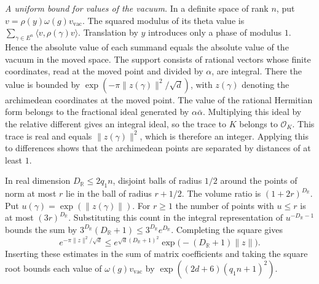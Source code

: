 \emph{A uniform bound for values of the vacuum.}
In a definite space of rank \(n\), put \(v=\rho(y)\omega(g)v_\mathrm{vac}\).
The squared modulus of its theta value is
\(\sum_{\gamma\in E^n}\langle v,\rho(\gamma)v\rangle\).
Translation by \(y\) introduces only a phase of modulus \(1\).
Hence the absolute value of each summand equals the absolute value of
the vacuum in the moved space. The support consists of rational
vectors whose finite coordinates, read at the moved point and divided
by \(\alpha\), are integral. There the value is bounded by
\(\exp(-\pi\|z(\gamma)\|^2/\sqrt d)\), with \(z(\gamma)\) denoting
the archimedean coordinates at the moved point.
The value of the rational Hermitian form belongs to the fractional
ideal generated by \(\alpha\bar\alpha\). Multiplying this ideal by the
relative different gives an integral ideal, so the trace to \(K\)
belongs to \(\mathcal O_K\). This trace is real and equals
\(\|z(\gamma)\|^2\), which is therefore an integer. Applying this
to differences shows that the archimedean points are separated
by distances of at least \(1\).

In real dimension \(D_{\mathbb R}\le2q_1n\), disjoint balls of radius
\(1/2\) around the points of norm at most \(r\) lie in the ball of
radius \(r+1/2\). The volume ratio is \((1+2r)^{D_{\mathbb R}}\).
Put \(u(\gamma)=\exp(\|z(\gamma)\|)\). For \(r\ge1\) the number of
points with \(u\le r\) is at most \((3r)^{D_{\mathbb R}}\).
Substituting this count in the integral representation of
\(u^{-D_{\mathbb R}-1}\) bounds the sum by
\(3^{D_{\mathbb R}}(D_{\mathbb R}+1)\le3^{D_{\mathbb R}}e^{D_{\mathbb R}}\).
Completing the square gives
\[
 e^{-\pi\|z\|^2/\sqrt d}\le
 e^{\sqrt d(D_{\mathbb R}+1)^2}\exp\bigl(-(D_{\mathbb R}+1)\|z\|\bigr).
\]
Inserting these estimates in the sum of matrix coefficients and taking
the square root bounds each value of \(\omega(g)v_\mathrm{vac}\) by
\(\exp((2d+6)(q_1n+1)^2)\).

